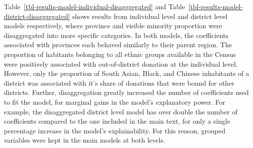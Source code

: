 \documentclass[
  letterpaper,
  DIV=11,
  numbers=noendperiod]{scrartcl}
\begin{document}
Table~\ref{tbl-results-model-individual-disaggregated} and
Table~\ref{tbl-results-model-district-disaggregated} shows results from
individual level and district level models respectively, where province
and visible minority proportion were disaggregated into more specific
categories. In both models, the coefficients associated with provinces
each behaved similarly to their parent region. The proportion of
habitants belonging to all ethnic groups available in the Census were
positively associated with out-of-district donation at the individual
level. However, only the proportion of South Asian, Black, and Chinese
inhabitants of a district was associated with it's share of donations
that were bound for other districts. Further, disaggregation greatly
increased the number of coefficients used to fit the model, for marginal
gains in the model's explanatory power. For example, the disaggregated
district level model has over double the number of coefficients compared
to the one included in the main text, for only a single percentage
increase in the model's explainability. For this reason, grouped
variables were kept in the main models at both levels.
\end{document}
